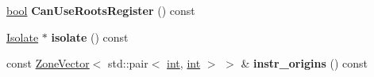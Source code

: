 \begin{DoxyCompactItemize}
\mbox{\hyperlink{classbool}{bool}} {\bfseries Can\+Use\+Roots\+Register} () const
\item 
\mbox{\label{classv8_1_1internal_1_1compiler_1_1InstructionSelector_a39a154694b9b230d2040178fed65efce}} 
\mbox{\hyperlink{classv8_1_1internal_1_1Isolate}{Isolate}} $\ast$ {\bfseries isolate} () const
\item 
\mbox{\label{classv8_1_1internal_1_1compiler_1_1InstructionSelector_af5f0f978df95abb8e18fe9f832cdf200}} 
const \mbox{\hyperlink{classv8_1_1internal_1_1ZoneVector}{Zone\+Vector}}$<$ std\+::pair$<$ \mbox{\hyperlink{classint}{int}}, \mbox{\hyperlink{classint}{int}} $>$ $>$ \& {\bfseries instr\+\_\+origins} () const
\end{DoxyCompactItemize}
